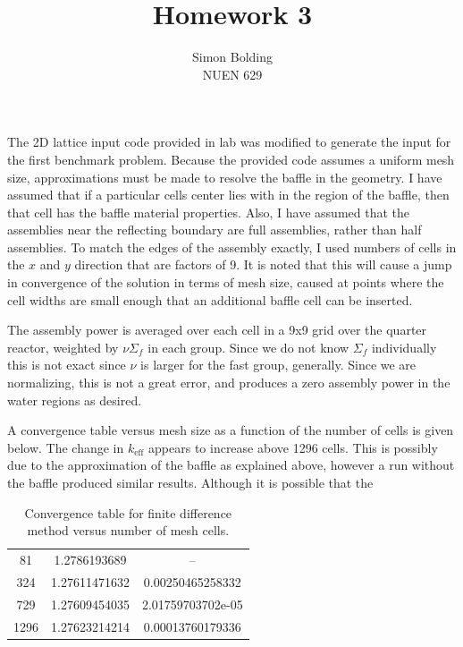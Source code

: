 \documentclass[12pt]{article}
\newcommand{\keff}{\ensuremath{k_{\mathrm{eff}}}}
\newenvironment{solnum}[2][Solution]{\begin{trivlist}
\item[\hskip \labelsep {\bfseries #1}\hskip \labelsep {\bfseries #2:}]\hspace{0.3in}\newline\newline}{\end{trivlist}}
\begin{document}
 
 
\title{Homework 3}%
\author{Simon Bolding\\ %
NUEN 629} %
 
\maketitle

\clearpage



\begin{solnum}{1-1}
    
The 2D lattice input code provided in lab was modified to generate the input for the
first
benchmark problem.  Because the
provided code assumes a uniform mesh size, approximations must be made to resolve the
baffle in the geometry.  I have assumed that if a particular cells center lies with
in the region of the baffle, then that cell has the baffle material properties.  Also, I have assumed that the assemblies near the reflecting
boundary are full assemblies, rather than half assemblies. To match the edges of the
assembly exactly, I used numbers of cells in the $x$ and $y$ direction that are
factors of 9.  It is noted that this will cause a jump in convergence of the solution
in terms of mesh size, caused at points where the cell widths are small enough that
an additional baffle  cell can be inserted.  

The assembly power is averaged over each
cell in a 9x9 grid over the quarter reactor, weighted by $\nu \Sigma_f$ in each
group.  Since we do not know $\Sigma_f$ individually this is not exact since $\nu$ is
larger for the fast group, generally.  Since we are normalizing, this is not a great
error, and produces a zero assembly power in the water regions as desired.

A convergence table versus mesh size as a function of the number of cells is given
below.  The change in $\keff$ appears to increase above 1296 cells.  This is possibly
due to the approximation of the baffle as explained above, however a run without the
baffle produced similar results.  Although it is possible that the 

\begin{table}
    \centering
    \caption{Convergence table for finite difference method versus number of mesh
    cells.}
\begin{tabular}{ccc} \hline
81   & 1.2786193689  &  -- \\ 
324       & 1.27611471632   & 0.00250465258332 \\
729       & 1.27609454035   & 2.01759703702e-05 \\
1296      & 1.27623214214   & 0.00013760179336  \\ \hline
    \end{tabular}
\end{table}


\end{solnum}
\end{document}
